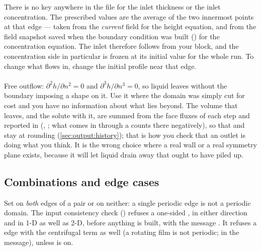 \begin{note}
  There is no key anywhere in the file for the inlet thickness or the inlet
  concentration. The prescribed values are the average of the two innermost
  points at that edge --- taken from the \emph{current} field for the height
  equation, and from the field snapshot saved when the boundary condition was
  built () for the concentration equation. The inlet
  therefore follows from your  block, and the concentration side
  in particular is frozen at its initial value for the whole run. To change
  what flows in, change the initial profile near that edge.
\end{note}

\paragraph{} Free outflow: $\partial^2 h/\partial n^2 = 0$ and
$\partial^3 h/\partial n^3 = 0$, so liquid leaves without the boundary imposing
a shape on it. Use it where the domain was simply cut for cost and you have no
information about what lies beyond. The volume that leaves, and the solute
with it, are summed from the face fluxes of each step and reported in
 (, ; what comes
in through a  counts there negatively), so that
 and  stay at rounding
(\cref{sec:output:history}); that is how you check that an outlet is doing
what you think. It is the wrong choice where a real wall or a real symmetry
plane exists, because it will let liquid drain away that ought to have piled
up.

\subsection{Combinations and edge cases}

Set  on \emph{both} edges of a pair or on neither: a single
periodic edge is not a periodic domain. The input consistency check
() refuses a one-sided , in either
direction and in 1-D as well as 2-D, before anything is built, with the message
. It refuses
a  edge with the centrifugal term as well (a rotating film is
not periodic;  in the message), unless
 is on.

